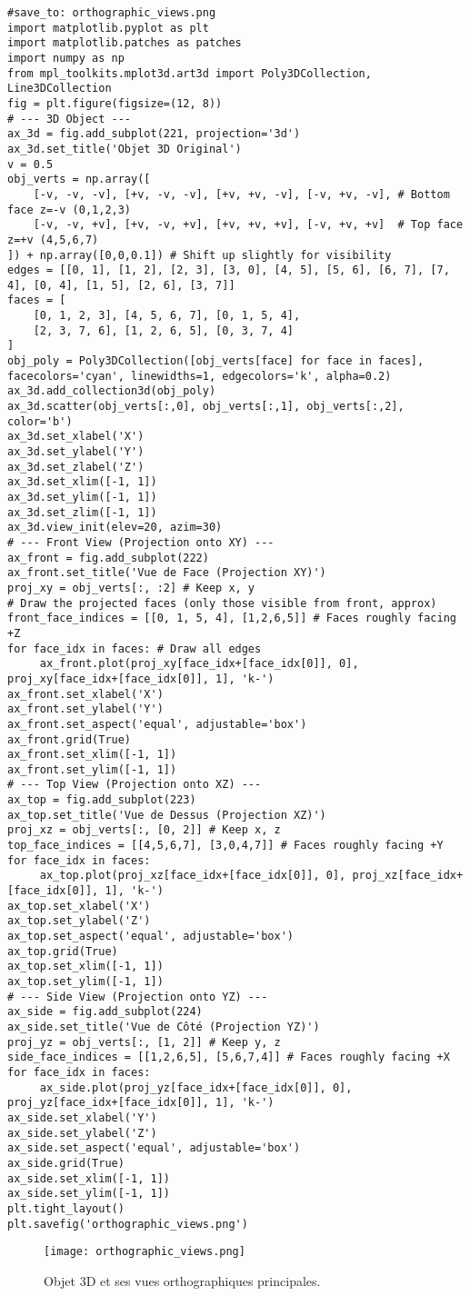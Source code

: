 \begin{verbatim}
#save_to: orthographic_views.png
import matplotlib.pyplot as plt
import matplotlib.patches as patches
import numpy as np
from mpl_toolkits.mplot3d.art3d import Poly3DCollection, Line3DCollection
fig = plt.figure(figsize=(12, 8))
# --- 3D Object ---
ax_3d = fig.add_subplot(221, projection='3d')
ax_3d.set_title('Objet 3D Original')
v = 0.5
obj_verts = np.array([
    [-v, -v, -v], [+v, -v, -v], [+v, +v, -v], [-v, +v, -v], # Bottom face z=-v (0,1,2,3)
    [-v, -v, +v], [+v, -v, +v], [+v, +v, +v], [-v, +v, +v]  # Top face    z=+v (4,5,6,7)
]) + np.array([0,0,0.1]) # Shift up slightly for visibility
edges = [[0, 1], [1, 2], [2, 3], [3, 0], [4, 5], [5, 6], [6, 7], [7, 4], [0, 4], [1, 5], [2, 6], [3, 7]]
faces = [
    [0, 1, 2, 3], [4, 5, 6, 7], [0, 1, 5, 4],
    [2, 3, 7, 6], [1, 2, 6, 5], [0, 3, 7, 4]
]
obj_poly = Poly3DCollection([obj_verts[face] for face in faces], facecolors='cyan', linewidths=1, edgecolors='k', alpha=0.2)
ax_3d.add_collection3d(obj_poly)
ax_3d.scatter(obj_verts[:,0], obj_verts[:,1], obj_verts[:,2], color='b')
ax_3d.set_xlabel('X')
ax_3d.set_ylabel('Y')
ax_3d.set_zlabel('Z')
ax_3d.set_xlim([-1, 1])
ax_3d.set_ylim([-1, 1])
ax_3d.set_zlim([-1, 1])
ax_3d.view_init(elev=20, azim=30)
# --- Front View (Projection onto XY) ---
ax_front = fig.add_subplot(222)
ax_front.set_title('Vue de Face (Projection XY)')
proj_xy = obj_verts[:, :2] # Keep x, y
# Draw the projected faces (only those visible from front, approx)
front_face_indices = [[0, 1, 5, 4], [1,2,6,5]] # Faces roughly facing +Z
for face_idx in faces: # Draw all edges
     ax_front.plot(proj_xy[face_idx+[face_idx[0]], 0], proj_xy[face_idx+[face_idx[0]], 1], 'k-')
ax_front.set_xlabel('X')
ax_front.set_ylabel('Y')
ax_front.set_aspect('equal', adjustable='box')
ax_front.grid(True)
ax_front.set_xlim([-1, 1])
ax_front.set_ylim([-1, 1])
# --- Top View (Projection onto XZ) ---
ax_top = fig.add_subplot(223)
ax_top.set_title('Vue de Dessus (Projection XZ)')
proj_xz = obj_verts[:, [0, 2]] # Keep x, z
top_face_indices = [[4,5,6,7], [3,0,4,7]] # Faces roughly facing +Y
for face_idx in faces:
     ax_top.plot(proj_xz[face_idx+[face_idx[0]], 0], proj_xz[face_idx+[face_idx[0]], 1], 'k-')
ax_top.set_xlabel('X')
ax_top.set_ylabel('Z')
ax_top.set_aspect('equal', adjustable='box')
ax_top.grid(True)
ax_top.set_xlim([-1, 1])
ax_top.set_ylim([-1, 1])
# --- Side View (Projection onto YZ) ---
ax_side = fig.add_subplot(224)
ax_side.set_title('Vue de Côté (Projection YZ)')
proj_yz = obj_verts[:, [1, 2]] # Keep y, z
side_face_indices = [[1,2,6,5], [5,6,7,4]] # Faces roughly facing +X
for face_idx in faces:
     ax_side.plot(proj_yz[face_idx+[face_idx[0]], 0], proj_yz[face_idx+[face_idx[0]], 1], 'k-')
ax_side.set_xlabel('Y')
ax_side.set_ylabel('Z')
ax_side.set_aspect('equal', adjustable='box')
ax_side.grid(True)
ax_side.set_xlim([-1, 1])
ax_side.set_ylim([-1, 1])
plt.tight_layout()
plt.savefig('orthographic_views.png')
\end{verbatim}
\begin{figure}[H]
\centering
\texttt{[image: orthographic\_views.png]}
\caption{Objet 3D et ses vues orthographiques principales.}
\label{fig:orthographic_views}
\end{figure}

